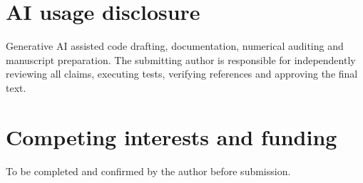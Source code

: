 \documentclass[11pt]{article}
\begin{document}
\section*{AI usage disclosure}
Generative AI assisted code drafting, documentation, numerical auditing and
manuscript preparation. The submitting author is responsible for independently
reviewing all claims, executing tests, verifying references and approving the
final text.

\section*{Competing interests and funding}
To be completed and confirmed by the author before submission.


\end{document}
